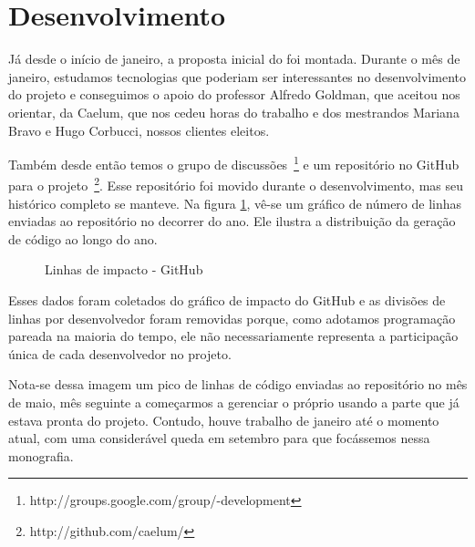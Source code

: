 \section{Desenvolvimento}

Já desde o início de janeiro, a proposta inicial do \calopsita{} foi montada. Durante o mês de janeiro, estudamos tecnologias que poderiam ser interessantes no desenvolvimento do projeto e conseguimos o apoio do professor Alfredo Goldman, que aceitou nos orientar, da Caelum, que nos cedeu horas do trabalho e dos mestrandos Mariana Bravo e Hugo Corbucci, nossos clientes eleitos.

Também desde então temos o grupo de discussões~\footnote{http://groups.google.com/group/\calopsita-development} e um repositório no GitHub para o projeto~\footnote{http://github.com/caelum/\calopsita}. Esse repositório foi movido durante o desenvolvimento, mas seu histórico completo se manteve. Na figura \ref{figura:github}, vê-se um gráfico de número de linhas enviadas ao repositório no decorrer do ano. Ele ilustra a distribuição da geração de código ao longo do ano.

\begin{figure}[H]
  \label{figura:github}
  \centering
  \caption{Linhas de impacto - GitHub}
\end{figure}

Esses dados foram coletados do gráfico de impacto do GitHub e as divisões de linhas por desenvolvedor foram removidas porque, como adotamos programação pareada na maioria do tempo, ele não necessariamente representa a participação única de cada desenvolvedor no projeto.

Nota-se dessa imagem um pico de linhas de código enviadas ao repositório no mês de maio, mês seguinte a começarmos a gerenciar o próprio \calopsita{} usando a parte que já estava pronta do projeto. Contudo, houve trabalho de janeiro até o momento atual, com uma considerável queda em setembro para que focássemos nessa monografia.

